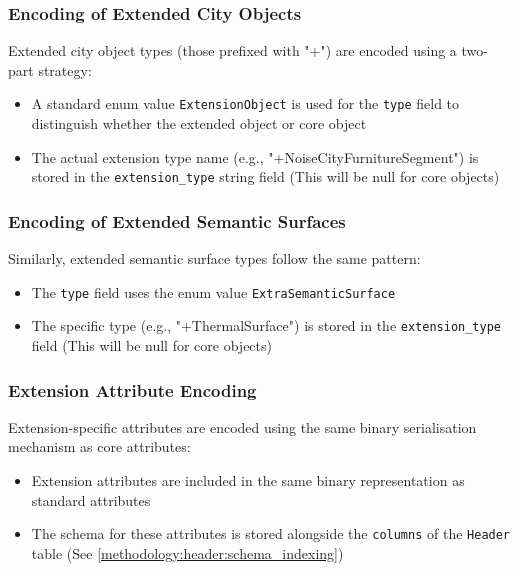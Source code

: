\subsubsection{Encoding of Extended City Objects}
\label{methodology:feature_encoding:extension_mechanism:city_objects}

Extended city object types (those prefixed with "+") are encoded using a two-part strategy:

\begin{itemize}
  \item A standard enum value \texttt{ExtensionObject} is used for the \texttt{type} field to distinguish whether the extended object or core object
  \item The actual extension type name (e.g., "+NoiseCityFurnitureSegment") is stored in the \texttt{extension\_type} string field (This will be null for core objects)
\end{itemize}

\subsubsection{Encoding of Extended Semantic Surfaces}
\label{methodology:feature_encoding:extension_mechanism:semantic_surfaces}

Similarly, extended semantic surface types follow the same pattern:

\begin{itemize}
  \item The \texttt{type} field uses the enum value \texttt{ExtraSemanticSurface}
  \item The specific type (e.g., "+ThermalSurface") is stored in the \texttt{extension\_type} field (This will be null for core objects)
\end{itemize}

\subsubsection{Extension Attribute Encoding}
\label{methodology:feature_encoding:extension_mechanism:attributes}

Extension-specific attributes are encoded using the same binary serialisation mechanism as core attributes:

\begin{itemize}
  \item Extension attributes are included in the same binary representation as standard attributes
  \item The schema for these attributes is stored alongside the \texttt{columns} of the \texttt{Header} table (See \autoref{methodology:header:schema_indexing})
\end{itemize}

